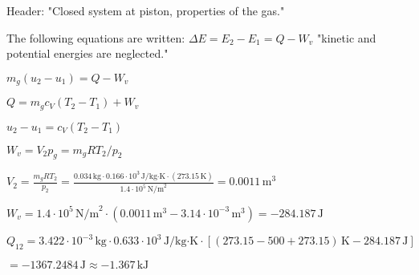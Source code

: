 Header: "Closed system at piston, properties of the gas."

The following equations are written:
\( \Delta E = E_2 - E_1 = Q - W_v \)  
"kinetic and potential energies are neglected."

\( m_g (u_2 - u_1) = Q - W_v \)

\( Q = m_g c_V (T_2 - T_1) + W_v \)

\( u_2 - u_1 = c_V (T_2 - T_1) \)

\( W_v = V_2 p_g = m_g R T_2 / p_2 \)

\( V_2 = \frac{m_g R T_2}{p_2} = \frac{0.034 \, \text{kg} \cdot 0.166 \cdot 10^3 \, \text{J/kg·K} \cdot (273.15 \, \text{K})}{1.4 \cdot 10^5 \, \text{N/m}^2} = 0.0011 \, \text{m}^3 \)

\( W_v = 1.4 \cdot 10^5 \, \text{N/m}^2 \cdot (0.0011 \, \text{m}^3 - 3.14 \cdot 10^{-3} \, \text{m}^3) = -284.187 \, \text{J} \)

\( Q_{12} = 3.422 \cdot 10^{-3} \, \text{kg} \cdot 0.633 \cdot 10^3 \, \text{J/kg·K} \cdot [(273.15 - 500 + 273.15) \, \text{K} - 284.187 \, \text{J}] \)

\( = -1367.2484 \, \text{J} \approx -1.367 \, \text{kJ} \)